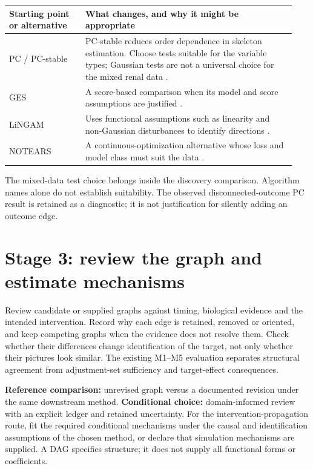 \documentclass[11pt,letterpaper]{article}
\begin{document}
\begingroup\small\setlength{\tabcolsep}{5pt}
\begin{longtable}{@{}L{0.25\linewidth}L{0.69\linewidth}@{}}
\toprule Starting point or alternative & What changes, and why it might be appropriate\\\midrule\endhead
PC / PC-stable & PC-stable reduces order dependence in skeleton estimation. Choose tests suitable for the variable types; Gaussian tests are not a universal choice for the mixed renal data \citep{ColomboMaathuis2014}.\\[4pt]
GES & A score-based comparison when its model and score assumptions are justified \citep{Chickering2002}.\\[4pt]
LiNGAM & Uses functional assumptions such as linearity and non-Gaussian disturbances to identify directions \citep{Shimizu2006}.\\[4pt]
NOTEARS & A continuous-optimization alternative whose loss and model class must suit the data \citep{Zheng2018}.\\
\bottomrule
\end{longtable}\endgroup

The mixed-data test choice belongs inside the discovery comparison. Algorithm names alone do not establish suitability. The observed disconnected-outcome PC result is retained as a diagnostic; it is not justification for silently adding an outcome edge.

\clearpage
\section*{Stage 3: review the graph and estimate mechanisms}

Review candidate or supplied graphs against timing, biological evidence and the intended intervention. Record why each edge is retained, removed or oriented, and keep competing graphs when the evidence does not resolve them. Check whether their differences change identification of the target, not only whether their pictures look similar. The existing M1--M5 evaluation separates structural agreement from adjustment-set sufficiency and target-effect consequences.

\textbf{Reference comparison:} unrevised graph versus a documented revision under the same downstream method. \textbf{Conditional choice:} domain-informed review with an explicit ledger and retained uncertainty. For the intervention-propagation route, fit the required conditional mechanisms under the causal and identification assumptions of the chosen method, or declare that simulation mechanisms are supplied. A DAG specifies structure; it does not supply all functional forms or coefficients.
\end{document}
